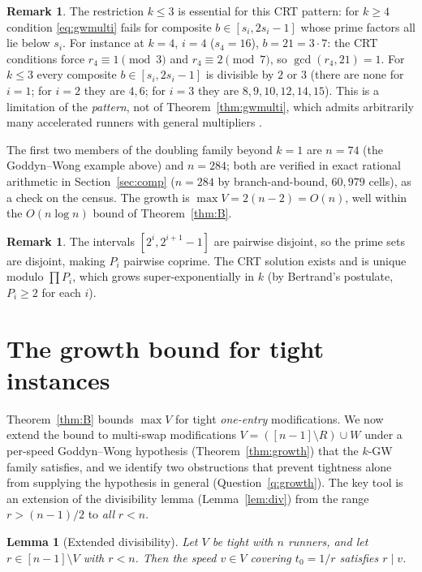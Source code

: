 \documentclass[11pt]{article}
\newtheorem{lemma}[theorem]{Lemma}
\theoremstyle{definition}
\newtheorem{remark}[theorem]{Remark}
\begin{document}
\begin{remark}\label{rem:kgw-k3}
The restriction $k\le3$ is essential for this CRT pattern: for $k\ge4$
condition \eqref{eq:gwmulti} fails for composite $b\in[s_i,2s_i-1]$
whose prime factors all lie below $s_i$.  For instance at $k=4$, $i=4$
($s_4=16$), $b=21=3\cdot7$: the CRT conditions force
$r_4\equiv1\pmod3$ and $r_4\equiv2\pmod7$, so $\gcd(r_4,21)=1$.  For
$k\le3$ every composite $b\in[s_i,2s_i-1]$ is divisible by $2$ or $3$
(there are none for $i=1$; for $i=2$ they are $4,6$; for $i=3$ they are
$8,9,10,12,14,15$).  This is a limitation of the \emph{pattern}, not of
Theorem~\ref{thm:gwmulti}, which admits arbitrarily many accelerated
runners with general multipliers \cite[Cor.~3.3]{GoddynWong2006}.
\end{remark}

The first two members of the doubling family beyond $k=1$ are $n=74$
(the Goddyn--Wong example above) and $n=284$; both are verified in
exact rational arithmetic in Section~\ref{sec:comp} ($n=284$ by
branch-and-bound, $60{,}979$ cells), as a check on the census.  The
growth is $\max V=2(n-2)=O(n)$, well within the $O(n\log n)$ bound of
Theorem~\ref{thm:B}.

\begin{remark}
The intervals $[2^i,2^{i+1}-1]$ are pairwise disjoint, so the prime
sets are disjoint, making $P_i$ pairwise coprime. The CRT solution
exists and is unique modulo $\prod P_i$, which grows
super-exponentially in $k$ (by Bertrand's postulate, $P_i\ge2$ for each $i$).
\end{remark}

\section{The growth bound for tight instances}\label{sec:growth}

Theorem~\ref{thm:B} bounds $\max V$ for tight \emph{one-entry}
modifications. We now extend the bound to multi-swap modifications
$V=([n-1]\setminus R)\cup W$ under a per-speed Goddyn--Wong hypothesis
(Theorem~\ref{thm:growth}) that the $k$-GW family satisfies, and we
identify two obstructions that prevent tightness alone from supplying
the hypothesis in general (Question~\ref{q:growth}). The key tool is an
extension of the divisibility lemma (Lemma~\ref{lem:div}) from the
range $r>(n-1)/2$ to \emph{all} $r<n$.

\begin{lemma}[Extended divisibility]\label{lem:extdiv}
Let $V$ be tight with $n$ runners, and let $r\in[n-1]\setminus V$ with
$r<n$. Then the speed $v\in V$ covering $t_0=1/r$ satisfies $r\mid v$.
\end{lemma}
\end{document}
